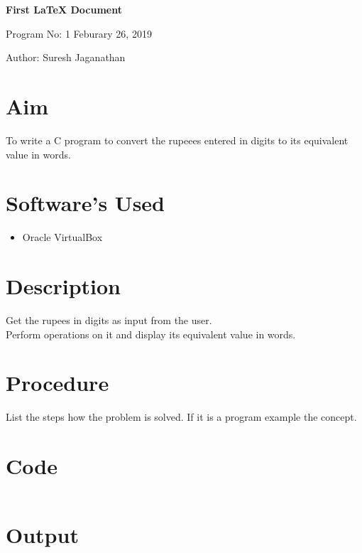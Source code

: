 \documentclass[a4paper,10pt]{article}
\begin{document}
\setcounter{secnumdepth}{-1} 

\begin{center}
\textbf{\LARGE First LaTeX Document}
\end{center}

\raggedright Program No: 1 \hfill \raggedleft Feburary 26, 2019 \\ 

\raggedright Author: Suresh Jaganathan \par 

\noindent\makebox[\linewidth]{\rule{\textwidth}{1pt}} 

\section{Aim}
To write a C program to convert the rupeees entered in digits to its equivalent value in words.

\section{Software's Used}
\begin{itemize}
  \item Oracle VirtualBox
\end{itemize}

\section{Description}
Get the rupees in digits as input from the user.
\\Perform operations on it and display its equivalent value in words.

\section{Procedure}
List the steps how the problem is solved. If it is a program example the concept.

\section{Code}
\begin{verbatim} 

\end{verbatim}

\section{Output}
\end{document}
